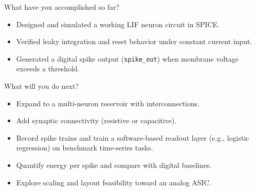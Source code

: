 \documentclass[final]{beamer}
\newlength{\sepwidth}
\newlength{\colwidth}
\newcommand{\separatorcolumn}{\begin{column}{\sepwidth}\end{column}}
\begin{document}
\begin{frame}[t]
\begin{columns}[t]
\begin{column}{\colwidth}
\begin{block}{What have you accomplished so far?}
\begin{itemize}
  \item Designed and simulated a working LIF neuron circuit in SPICE.
  \item Verified leaky integration and reset behavior under constant current input.
  \item Generated a digital spike output (\texttt{spike\_out}) when membrane voltage exceeds a threshold.
\end{itemize}
\end{block}


\begin{block}{What will you do next?}
\begin{itemize}
  \item Expand to a multi-neuron reservoir with interconnections.
  \item Add synaptic connectivity (resistive or capacitive).
  \item Record spike trains and train a software-based readout layer (e.g., logistic regression) on benchmark time-series tasks.
  \item Quantify energy per spike and compare with digital baselines.
  \item Explore scaling and layout feasibility toward an analog ASIC.
\end{itemize}
\end{block}

\end{column}

\separatorcolumn

\end{columns}

\end{frame}
\end{document}
